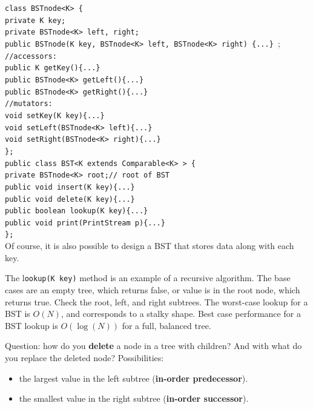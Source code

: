 \texttt{class BSTnode<K> \{} \\
\indent \indent \texttt{private K key;} \\
\indent \indent \texttt{private BSTnode<K> left, right;} \\
\indent \indent \texttt{public BSTnode(K key, BSTnode<K> left, BSTnode<K> right) \{...\} }; \\
\indent \indent \texttt{//accessors:} \\
\indent \indent \texttt{public K getKey()\{...\}} \\
\indent \indent \texttt{public BSTnode<K> getLeft()\{...\}} \\
\indent \indent \texttt{public BSTnode<K> getRight()\{...\}} \\
\indent \indent \texttt{//mutators:} \\
\indent \indent \texttt{void setKey(K key)\{...\}} \\
\indent \indent \texttt{void setLeft(BSTnode<K> left)\{...\}} \\
\indent \indent \texttt{void setRight(BSTnode<K> right)\{...\}} \\
\indent \texttt{\};} \\

\texttt{public class BST<K extends Comparable<K> > \{} \\
\indent \indent \texttt{private BSTnode<K> root;// root of BST} \\
\indent \indent \texttt{public void insert(K key)\{...\}} \\
\indent \indent \texttt{public void delete(K key)\{...\}} \\
\indent \indent \texttt{public boolean lookup(K key)\{...\}} \\
\indent \indent \texttt{public void print(PrintStream p)\{...\}} \\
\indent \texttt{\};} \\

Of course, it is also possible to design a BST that stores data along with each key. 

The l\texttt{ookup(K key)} method is an example of a recursive algorithm. The base cases are an empty tree, which returns false, or value is in the root node, which returns true. Check the root, left, and right subtrees. The worst-case lookup for a BST is $O(N)$, and corresponds to a stalky shape. Best case performance for a BST lookup is $O(\log(N))$ for a full, balanced tree. 

Question: how do you \textbf{delete} a node in a tree with children? And with what do you replace the deleted node? Possibilities:
\begin{itemize}
	\item the largest value in the left subtree (\textbf{in-order predecessor}). 
	\item the smallest value in the right subtree (\textbf{in-order successor}). 
\end{itemize}

